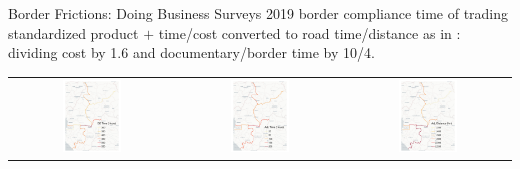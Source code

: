 \documentclass[aspectratio=169,xcolor=dvipsnames]{beamer}
\begin{document}
\begin{frame}{Border Frictions: Doing Business Surveys} \vspace{-3mm}
\small 2019 border compliance time of trading standardized product $+$ time/cost converted to road time/distance as in \citet{krantz2024optimal}: dividing cost by 1.6 and documentary/border time by 10/4.
\begin{adjustbox}{center}
\begin{tabular}{@{}c@{}c@{}@{}c@{}}
\includegraphics[width=0.38\textwidth, trim= {1cm 0 1cm 0}, clip]{"../figures/trade_costs/DBS_border_time_hours_map.pdf"} & 
\includegraphics[width=0.38\textwidth, trim= {1cm 0 1cm 0}, clip]{"../figures/trade_costs/DBS_border_time_hours_adj_map.pdf"} & 
\includegraphics[width=0.38\textwidth, trim= {1cm 0 1cm 0}, clip]{"../figures/trade_costs/DBS_border_dist_km_adj_map.pdf"}
\end{tabular}
\end{adjustbox}
\end{frame}
\end{document}
